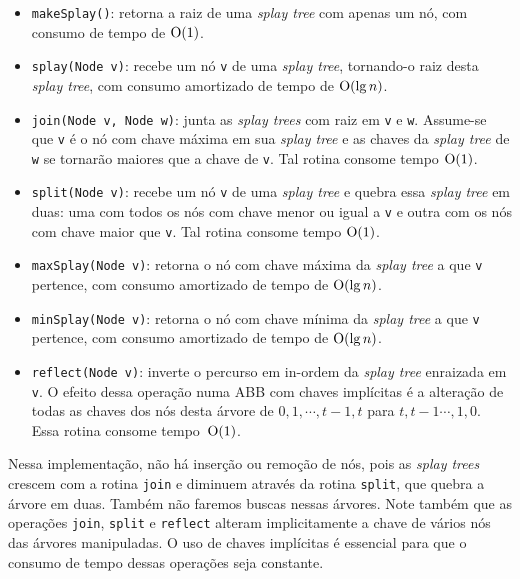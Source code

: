 \begin{itemize}
    \item \texttt{makeSplay()}: retorna a raiz de uma \emph{splay tree} com apenas um nó, com consumo de tempo de $\mathrm{O}(1)$.  

    \item \texttt{splay(Node v)}: recebe um nó \texttt{v} de uma \emph{splay tree}, tornando-o raiz desta \emph{splay tree}, com consumo amortizado de tempo de $\mathrm{O}(\lg n)$.  

    \item \texttt{join(Node v, Node w)}: junta as \emph{splay trees} com raiz em \texttt{v} e \texttt{w}. Assume-se que \texttt{v} é o nó com chave máxima em sua \emph{splay tree} e as chaves da \emph{splay tree} de \texttt{w} se tornarão maiores que a chave de \texttt{v}. Tal rotina consome tempo $\mathrm{O}(1)$.  

    \item \texttt{split(Node v)}: recebe um nó \texttt{v} de uma \emph{splay tree} e quebra essa \emph{splay tree} em duas: uma com todos os nós com chave menor ou igual a \texttt{v} e outra com os nós com chave maior que \texttt{v}. Tal rotina consome tempo $\mathrm{O}(1)$.  

    \item \texttt{maxSplay(Node v)}: retorna o nó com chave máxima da \emph{splay tree} a que \texttt{v} pertence, com consumo amortizado de tempo de $\mathrm{O}(\lg n)$.  

    \item \texttt{minSplay(Node v)}: retorna o nó com chave mínima da \emph{splay tree} a que \texttt{v} pertence, com consumo amortizado de tempo de $\mathrm{O}(\lg n)$.  

    \item \texttt{reflect(Node v)}: inverte o percurso em in-ordem da \emph{splay tree} enraizada em \texttt{v}. O efeito dessa operação numa ABB com chaves implícitas é a alteração de todas as chaves dos nós desta árvore de $0, 1, \cdots, t{-}1,t$ para $t,t{-}1\cdots, 1, 0$. Essa rotina consome tempo~$\mathrm{O}(1)$.  


\end{itemize}

Nessa implementação, não há inserção ou remoção de nós, pois as \emph{splay trees} crescem com a rotina \texttt{join} e diminuem através da rotina \texttt{split}, que quebra a árvore em duas. Também não faremos buscas nessas árvores. Note também que as operações \texttt{join}, \texttt{split} e \texttt{reflect} alteram implicitamente a chave de vários nós das árvores manipuladas. O uso de chaves implícitas é essencial para que o consumo de tempo dessas operações seja constante.  
